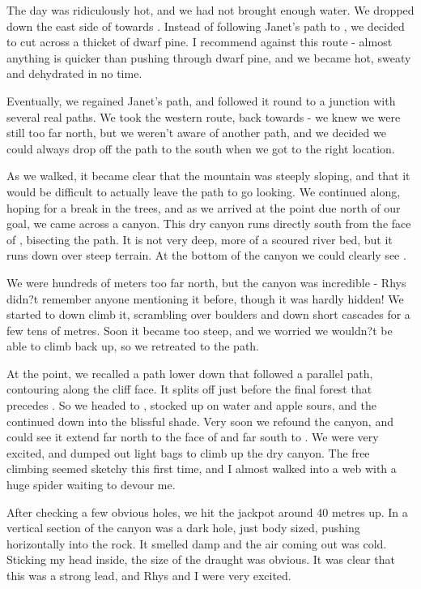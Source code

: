     The day was ridiculously hot, and we had not brought enough water. We dropped down the east side of  towards . Instead of following Janet's path to , we decided to cut across a thicket of dwarf pine. I recommend against this route - almost anything is quicker than pushing through dwarf pine, and we became hot, sweaty and dehydrated in no time.

    Eventually, we regained Janet's path, and followed it round to a junction with several real paths. We took the western route, back towards  - we knew we were still too far north, but we weren't aware of another path, and we decided we could always drop off the path to the south when we got to the right location.

    As we walked, it became clear that the mountain was steeply sloping, and that it would be difficult to actually leave the path to go looking. We continued along, hoping for a break in the trees, and as we arrived at the point due north of our goal, we came across a canyon. This dry canyon runs directly south from the face of , bisecting the path. It is not very deep, more of a scoured river bed, but it runs down over steep terrain. At the bottom of the canyon we could clearly see .

    We were hundreds of meters too far north, but the canyon was incredible - Rhys didn?t remember anyone mentioning it before, though it was hardly hidden! We started to down climb it, scrambling over boulders and down short cascades for a few tens of metres. Soon it became too steep, and we worried we wouldn?t be able to climb back up, so we retreated to the path.

    At the point, we recalled a path lower down that followed a parallel path, contouring along the cliff face. It splits off just before the final forest that precedes . So we headed to , stocked up on water and apple sours, and the continued down into the blissful shade. Very soon we refound the canyon, and could see it extend far north to the face of  and far south to . We were very excited, and dumped out light bags to climb up the dry canyon. The free climbing seemed sketchy this first time, and I almost walked into a web with a huge spider waiting to devour me. 

    After checking a few obvious holes, we hit the jackpot around 40 metres up. In a vertical section of the canyon was a dark hole, just body sized, pushing horizontally into the rock. It smelled damp and the air coming out was cold. Sticking my head inside, the size of the draught was obvious. It was clear that this was a strong lead, and Rhys and I were very excited.

